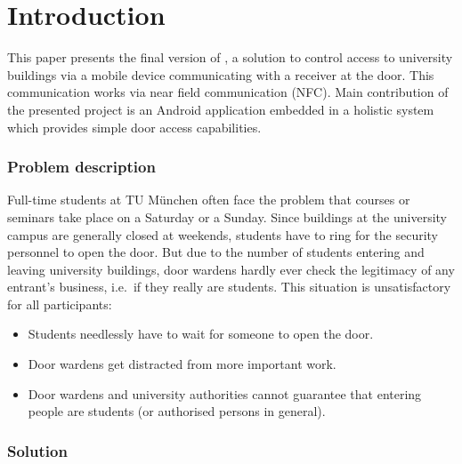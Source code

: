 \bigskip
\bigskip


\section{Introduction}

This paper presents the final version of \app, a solution to control access to university buildings via a mobile device communicating with a receiver at the door.
This communication works via near field communication (NFC).
Main contribution of the presented project is an Android application embedded in a holistic system which provides simple door access capabilities.




\subsubsection*{Problem description}


Full-time students at TU München often face the problem that courses or seminars take place on a Saturday or a Sunday.
Since buildings at the university campus are generally closed at weekends, students have to ring for the security personnel to open the door.
But due to the number of students entering and leaving university buildings, door wardens hardly ever check the legitimacy of any entrant's business, i.e.~if they really are students.
This situation is unsatisfactory for all participants:

\begin{itemize}
\item Students needlessly have to wait for someone to open the door.
\item Door wardens get distracted from more important work.
\item Door wardens and university authorities cannot guarantee that entering people are students (or authorised persons in general).
\end{itemize}

\subsubsection*{Solution}


